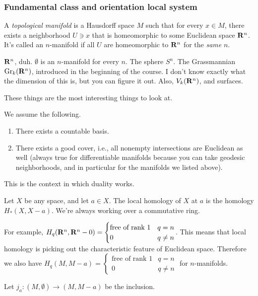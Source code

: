 \subsubsection{Fundamental class and orientation local system}
\begin{definition}
A \emph{topological manifold} is a Hausdorff space $M$ such that for every $x\in M$, there exists a neighborhood $U\ni x$ that is homeomorphic to some Euclidean space $\mathbf R^n$. It's called an $n$-manifold if all $U$ are homeomorphic to $\mathbf R^n$ for the \emph{same} $n$.
\end{definition}
\begin{example}
$\mathbf R^n$, duh. $\emptyset$ is an $n$-manifold for every $n$. The sphere $S^n$. The Grassmannian $\mathrm{Gr}_k(\mathbf R^n)$, introduced in the beginning of the course. I don't know exactly what the dimension of this is, but you can figure it out. Also, $V_k(\mathbf R^n)$, and surfaces.
\end{example}
These things are the most interesting things to look at.
\begin{warning}
We assume the following.
\begin{enumerate}
\item There exists a countable basis.
\item There exists a good cover, i.e., all nonempty intersections are Euclidean as well (always true for differentiable manifolds because you can take geodesic neighborhoods, and in particular for the manifolds we listed above).
\end{enumerate}
\end{warning}
This is the context in which duality works.
\begin{definition}
Let $X$ be any space, and let $a\in X$. The local homology of $X$ at $a$ is the homology $H_\ast(X,X-a)$. We're always working over a commutative ring.
\end{definition}
For example, $H_q(\mathbf R^n,\mathbf R^n-0)=\begin{cases}\text{free of rank }1 & q=n \\ 0 & q\neq n\end{cases}$. This means that local homology is picking out the characteristic feature of Euclidean space. Therefore we also have $H_q(M,M-a)=\begin{cases}\text{free of rank }1 & q=n \\ 0 & q\neq n\end{cases}$ for $n$-manifolds.
\begin{notation}
Let $j_a:(M,\emptyset)\to (M,M-a)$ be the inclusion.
\end{notation}
